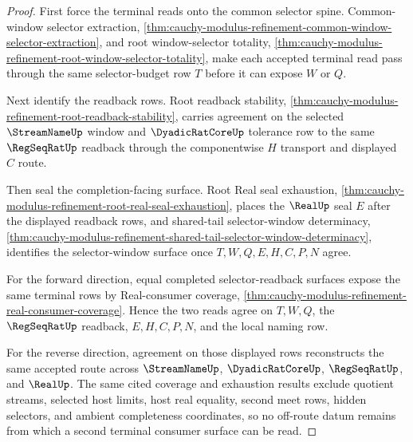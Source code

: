 \begin{proof}
First force the terminal reads onto the common selector spine. Common-window selector extraction, \autoref{thm:cauchy-modulus-refinement-common-window-selector-extraction}, and root window-selector totality, \autoref{thm:cauchy-modulus-refinement-root-window-selector-totality}, make each accepted terminal read pass through the same selector-budget row $T$ before it can expose $W$ or $Q$.

Next identify the readback rows. Root readback stability, \autoref{thm:cauchy-modulus-refinement-root-readback-stability}, carries agreement on the selected $\StreamNameUp$ window and $\DyadicRatCoreUp$ tolerance row to the same $\RegSeqRatUp$ readback through the componentwise $H$ transport and displayed $C$ route.

Then seal the completion-facing surface. Root Real seal exhaustion, \autoref{thm:cauchy-modulus-refinement-root-real-seal-exhaustion}, places the $\RealUp$ seal $E$ after the displayed readback rows, and shared-tail selector-window determinacy, \autoref{thm:cauchy-modulus-refinement-shared-tail-selector-window-determinacy}, identifies the selector-window surface once $T,W,Q,E,H,C,P,N$ agree.

For the forward direction, equal completed selector-readback surfaces expose the same terminal rows by Real-consumer coverage, \autoref{thm:cauchy-modulus-refinement-real-consumer-coverage}. Hence the two reads agree on $T,W,Q$, the $\RegSeqRatUp$ readback, $E,H,C,P,N$, and the local naming row.

For the reverse direction, agreement on those displayed rows reconstructs the same accepted route across $\StreamNameUp$, $\DyadicRatCoreUp$, $\RegSeqRatUp$, and $\RealUp$. The same cited coverage and exhaustion results exclude quotient streams, selected host limits, host real equality, second meet rows, hidden selectors, and ambient completeness coordinates, so no off-route datum remains from which a second terminal consumer surface can be read.
\end{proof}

